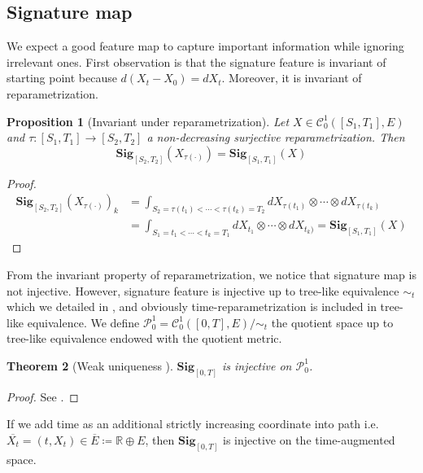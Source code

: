 \documentclass[12pt]{report}
\newtheorem{theorem}{Theorem}[chapter]
\newtheorem{proposition}[theorem]{Proposition}
\theoremstyle{definition}
\theoremstyle{remark}
\newcommand{\R}{\mathbb{R}}
\begin{document}
\subsection{Signature map}
We expect a good feature map to capture important information while ignoring irrelevant ones. First observation is that the signature feature is invariant of starting point because $d(X_{t} - X_{0}) = dX_{t}$. Moreover, it is invariant of reparametrization.
\begin{proposition}[Invariant under reparametrization]\label{invariant}
  Let $X \in \mathcal{C}^{1}_{0}([S_{1},T_{1}],E)$ and  $\tau\colon [S_{1},T_{1}] \to [S_{2},T_{2}]$ a non-decreasing surjective reparametrization. Then 
  \begin{equation}
    \mathbf{Sig}_{[S_{2},T_{2}]}(X_{\tau(\cdot)}) = \mathbf{Sig}_{[S_{1},T_{1}]}(X) 
  \end{equation}
\end{proposition}
\begin{proof}
  \begin{equation}
    \begin{split}
      \mathbf{Sig}_{[S_{2},T_{2}]}(X_{\tau(\cdot)})_{k} &= \int_{S_{2} = \tau(t_{1})<\cdots< \tau(t_{k}) = T_{2}}dX_{\tau(t_{1})}\otimes\cdots\otimes dX_{\tau(t_{k})}\\
      &= \int_{S_{1} = t_{1}<\cdots< t_{k} = T_{1}}dX_{t_{1}}\otimes\cdots\otimes dX_{t_{k})} = \mathbf{Sig}_{[S_{1},T_{1}]}(X) 
    \end{split}
  \end{equation}
\end{proof}
From the invariant property of reparametrization, we notice that signature map is not injective. However, signature feature is injective up to tree-like equivalence $\sim_{t}$ which we detailed in \cite{boedihardjo2016signature}, and obviously time-reparametrization is included in tree-like equivalence. We define $\mathcal{P}_{0}^{1} = \mathcal{C}^{1}_{0}([0,T],E) / \sim_{t}$ the quotient space up to tree-like equivalence endowed with the quotient metric.  
\begin{theorem}[Weak uniqueness \cite{boedihardjo2016signature}] \label{uniqueness}
  $\mathbf{Sig}_{[0,T]}$ is injective on $\mathcal{P}_{0}^{1}$.
\end{theorem}
\begin{proof}
  See \cite{boedihardjo2016signature}.
\end{proof}
If we add time as an additional strictly increasing coordinate into path i.e. $\overline{X_{t}} = (t,X_{t}) \in \overline{E} \coloneq \R\oplus E$, then $\mathbf{Sig}_{[0,T]}$ is injective on the time-augmented space. 
\end{document}
